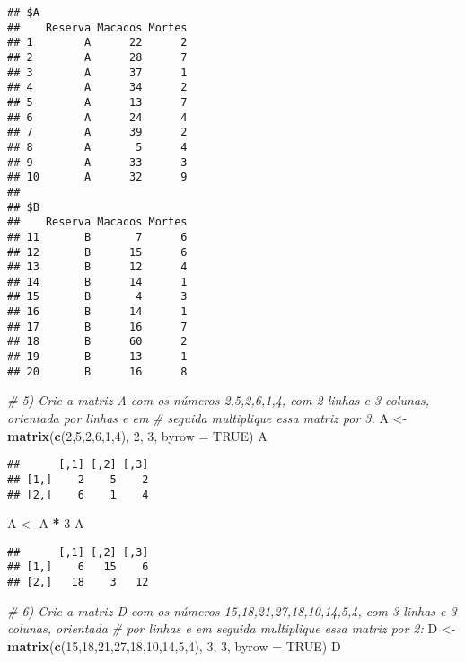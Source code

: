 \documentclass[]{article}
\newenvironment{Shaded}{\begin{snugshade}}{\end{snugshade}}
\newcommand{\CommentTok}[1]{\textcolor[rgb]{0.56,0.35,0.01}{\textit{#1}}}
\newcommand{\DataTypeTok}[1]{\textcolor[rgb]{0.13,0.29,0.53}{#1}}
\newcommand{\DecValTok}[1]{\textcolor[rgb]{0.00,0.00,0.81}{#1}}
\newcommand{\KeywordTok}[1]{\textcolor[rgb]{0.13,0.29,0.53}{\textbf{#1}}}
\newcommand{\NormalTok}[1]{#1}
\newcommand{\OperatorTok}[1]{\textcolor[rgb]{0.81,0.36,0.00}{\textbf{#1}}}
\newcommand{\OtherTok}[1]{\textcolor[rgb]{0.56,0.35,0.01}{#1}}
\newcommand{\StringTok}[1]{\textcolor[rgb]{0.31,0.60,0.02}{#1}}
\begin{document}
\begin{verbatim}
## $A
##    Reserva Macacos Mortes
## 1        A      22      2
## 2        A      28      7
## 3        A      37      1
## 4        A      34      2
## 5        A      13      7
## 6        A      24      4
## 7        A      39      2
## 8        A       5      4
## 9        A      33      3
## 10       A      32      9
## 
## $B
##    Reserva Macacos Mortes
## 11       B       7      6
## 12       B      15      6
## 13       B      12      4
## 14       B      14      1
## 15       B       4      3
## 16       B      14      1
## 17       B      16      7
## 18       B      60      2
## 19       B      13      1
## 20       B      16      8
\end{verbatim}

\begin{Shaded}
\begin{Highlighting}[]
\CommentTok{# 5) Crie a matriz A com os números 2,5,2,6,1,4, com 2 linhas e 3 colunas, orientada por linhas e em}
\CommentTok{# seguida multiplique essa matriz por 3.}
\NormalTok{A <-}\StringTok{ }\KeywordTok{matrix}\NormalTok{(}\KeywordTok{c}\NormalTok{(}\DecValTok{2}\NormalTok{,}\DecValTok{5}\NormalTok{,}\DecValTok{2}\NormalTok{,}\DecValTok{6}\NormalTok{,}\DecValTok{1}\NormalTok{,}\DecValTok{4}\NormalTok{), }\DecValTok{2}\NormalTok{, }\DecValTok{3}\NormalTok{, }\DataTypeTok{byrow =} \OtherTok{TRUE}\NormalTok{)}
\NormalTok{A}
\end{Highlighting}
\end{Shaded}

\begin{verbatim}
##      [,1] [,2] [,3]
## [1,]    2    5    2
## [2,]    6    1    4
\end{verbatim}

\begin{Shaded}
\begin{Highlighting}[]
\NormalTok{A <-}\StringTok{ }\NormalTok{A }\OperatorTok{*}\StringTok{ }\DecValTok{3}
\NormalTok{A}
\end{Highlighting}
\end{Shaded}

\begin{verbatim}
##      [,1] [,2] [,3]
## [1,]    6   15    6
## [2,]   18    3   12
\end{verbatim}

\begin{Shaded}
\begin{Highlighting}[]
\CommentTok{# 6) Crie a matriz D com os números 15,18,21,27,18,10,14,5,4, com 3 linhas e 3 colunas, orientada}
\CommentTok{# por linhas e em seguida multiplique essa matriz por 2:}
\NormalTok{D <-}\StringTok{ }\KeywordTok{matrix}\NormalTok{(}\KeywordTok{c}\NormalTok{(}\DecValTok{15}\NormalTok{,}\DecValTok{18}\NormalTok{,}\DecValTok{21}\NormalTok{,}\DecValTok{27}\NormalTok{,}\DecValTok{18}\NormalTok{,}\DecValTok{10}\NormalTok{,}\DecValTok{14}\NormalTok{,}\DecValTok{5}\NormalTok{,}\DecValTok{4}\NormalTok{), }\DecValTok{3}\NormalTok{, }\DecValTok{3}\NormalTok{, }\DataTypeTok{byrow =} \OtherTok{TRUE}\NormalTok{)}
\NormalTok{D}
\end{Highlighting}
\end{Shaded}
\end{document}
